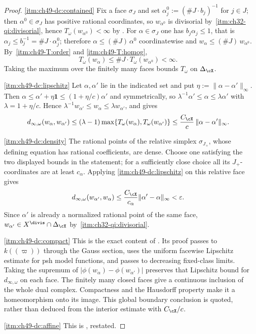 \begin{proof}
\cref{itm:ch49-dc:contained}  Fix a face $\sigma_J$ and set
$\alpha^0_j:=(\#J\cdot b_j)^{-1}$ for $j\in J$; then
$\alpha^0\in\sigma_J$ has positive rational coordinates, so $w_{\alpha^0}$
is divisorial by
\,\cref{itm:ch32-qi:divisorial},
hence $T_\omega(w_{\alpha^0})<\infty$ by
.  For $\alpha\in\sigma_J$ one has
$b_j\alpha_j\le1$, that is $\alpha_j\le b_j^{-1}=\#J\cdot\alpha^0_j$;
therefore $\alpha\le(\#J)\,\alpha^0$ coordinatewise and
$w_\alpha\le(\#J)\,w_{\alpha^0}$.  By
\,\cref{itm:ch49-T:order} and
\cref{itm:ch49-T:homog},
\[
 T_\omega(w_\alpha)\le\#J\cdot T_\omega(w_{\alpha^0})<\infty .
\]
Taking the maximum over the finitely many faces bounds $T_\omega$ on
$\Delta_\cX$.

\cref{itm:ch49-dc:lipschitz}  Let $\alpha,\alpha'$ lie in the indicated
set and put $\eta:=\|\alpha-\alpha'\|_\infty$.  Then
$\alpha\le\alpha'+\eta\mathbf 1\le(1+\eta/c)\alpha'$ and symmetrically,
so $\lambda^{-1}\alpha'\le\alpha\le\lambda\alpha'$ with
$\lambda=1+\eta/c$.  Hence
$\lambda^{-1}w_{\alpha'}\le w_\alpha\le\lambda w_{\alpha'}$, and
 gives
\[
 d_{\infty,\omega}(w_\alpha,w_{\alpha'})
 \le(\lambda-1)\max\{T_\omega(w_\alpha),T_\omega(w_{\alpha'})\}
 \le\frac{C_\cX}{c}\,\|\alpha-\alpha'\|_\infty .
\]

\cref{itm:ch49-dc:density}  The rational points of the relative simplex
$\sigma_{J_+}$, whose defining equation has rational coefficients, are
dense.  Choose one satisfying the two displayed bounds in the statement;
for a sufficiently close choice all its $J_+$-coordinates are at least
$c_\alpha$.  Applying \cref{itm:ch49-dc:lipschitz} on this relative face
gives
\[
 d_{\infty,\omega}(w_{\alpha'},w_\alpha)
 \le\frac{C_\cX}{c_\alpha}\|\alpha'-\alpha\|_\infty
 <\varepsilon.
\]
Since $\alpha'$ is already a normalized rational point of the same face,
$w_{\alpha'}\in X^{\divis}\cap\Delta_\cX$ by
\,\cref{itm:ch32-qi:divisorial}.

\cref{itm:ch49-dc:compact}  This is the exact content of
\cite[Theorem~A.4]{BJ22}.  Its proof passes to $k((\varpi))$ through
the Gauss section, uses the uniform facewise Lipschitz estimate
\cite[Theorem~6.1]{BFJ16} for psh model functions, and passes to
decreasing fixed-class limits.  Taking the supremum of
$|\phi(w_\alpha)-\phi(w_{\alpha'})|$ preserves that Lipschitz bound
for $d_{\infty,\omega}$ on each face.  The finitely many closed faces
give a continuous inclusion of the whole dual complex.
Compactness and the Hausdorff property make it a homeomorphism onto
its image.  This global boundary conclusion is quoted, rather than
deduced from the interior estimate with $C_\cX/c$.

\cref{itm:ch49-dc:affine}  This is
, restated.
\end{proof}

